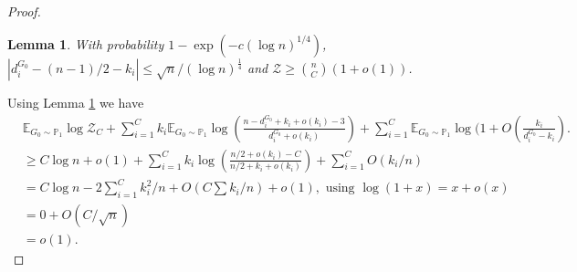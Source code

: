 \documentclass[12pt,a4paper]{article}
\numberwithin{equation}{section}
\newtheorem{lemma}[theorem]{Lemma}
\numberwithin{equation}{section}
\newcommand{\1}{{\text{\Large $\mathfrak 1$}}}
\newcommand{\2}[1]{{\text{\Large $\mathfrak 1$}\!\left(#1\right)}}
\begin{document}
\begin{proof}
\begin{lemma}\label{lem1}
With probability $1-\exp(-c(\log n)^{1/4})$, $|d^{G_0}_i-(n-1)/2-k_i| \leq \sqrt{n}/(\log n)^{\frac{1}{4}}$ and $ \mathcal{Z} \geq \binom{n}{C}(1+o(1))$.
\end{lemma}

Using Lemma \ref{lem1} we have
\begin{align*}
&\mathbb{E}_{G_0 \sim \mathbb{P}_1} \log \mathcal{Z}_C+\sum_{i=1}^Ck_i\mathbb{E}_{G_0 \sim \mathbb{P}_1}\log \left(\frac{n-d^{G_0}_i+k_i+o(k_i)-3}{d^{G_0}_i+o(k_i)}\right)+\sum_{i=1}^C\mathbb{E}_{G_0 \sim \mathbb{P}_1}\log (1+O(\frac{k_i}{d^{G_0}_i-k_i}).\\
& \geq C\log n+o(1)+\sum_{i=1}^Ck_i\log \left(\frac{n/2+o(k_i)-C}{n/2+k_i+o(k_i)}\right)+\sum_{i=1}^CO(k_i/n)\\
&= C\log n-2\sum_{i=1}^Ck_i^2/n+O(C\sum k_i /n)+o(1), \text{ using } \log (1+x)=x+o(x)\\
&=0+O(C/\sqrt{n})\\
&=o(1).
\end{align*}


\end{proof}
\end{document}
